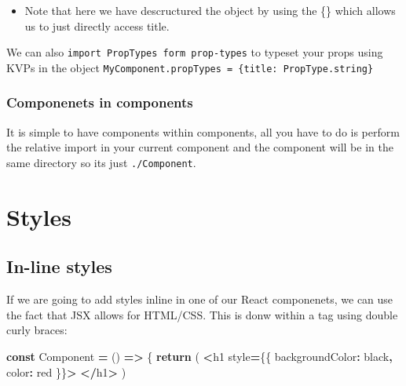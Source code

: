 \documentclass[
]{report}
\newenvironment{Shaded}{\begin{snugshade}}{\end{snugshade}}
\newcommand{\ControlFlowTok}[1]{\textcolor[rgb]{0.13,0.29,0.53}{\textbf{#1}}}
\newcommand{\DataTypeTok}[1]{\textcolor[rgb]{0.13,0.29,0.53}{#1}}
\newcommand{\KeywordTok}[1]{\textcolor[rgb]{0.13,0.29,0.53}{\textbf{#1}}}
\newcommand{\NormalTok}[1]{#1}
\newcommand{\OperatorTok}[1]{\textcolor[rgb]{0.81,0.36,0.00}{\textbf{#1}}}
\newcommand{\StringTok}[1]{\textcolor[rgb]{0.31,0.60,0.02}{#1}}
\providecommand{\tightlist}{%
  \setlength{\itemsep}{0pt}\setlength{\parskip}{0pt}}
\theoremstyle{definition}
\theoremstyle{definition}
\theoremstyle{definition}
\theoremstyle{definition}
\theoremstyle{remark}
\begin{document}
\begin{itemize}
\tightlist
\item
  Note that here we have descructured the object by using the \{\} which allows us to just directly access title.
\end{itemize}

We can also \texttt{import\ PropTypes\ form\ \textquotesingle{}prop-types\textquotesingle{}} to typeset your props using KVPs in the object \texttt{MyComponent.propTypes\ =\ \{title:\ PropType.string\}}

\hypertarget{componenets-in-components}{%
\subsection{Componenets in components}\label{componenets-in-components}}

It is simple to have components within components, all you have to do is
perform the relative import in your current component and the component will be
in the same directory so its just \texttt{\textquotesingle{}./Component}.

\hypertarget{styles}{%
\chapter{Styles}\label{styles}}

\hypertarget{in-line-styles}{%
\section{In-line styles}\label{in-line-styles}}

If we are going to add styles inline in one of our React componenets, we can use the fact that JSX allows for HTML/CSS. This is donw within a tag using double curly braces:

\begin{Shaded}
\begin{Highlighting}[]
\KeywordTok{const}\NormalTok{ Component }\OperatorTok{=}\NormalTok{ () }\KeywordTok{=\textgreater{}}\NormalTok{ \{}
    \ControlFlowTok{return}\NormalTok{ (}
        \OperatorTok{\textless{}}\NormalTok{h1 style}\OperatorTok{=}\NormalTok{\{\{ }\DataTypeTok{backgroundColor}\OperatorTok{:} \StringTok{\textquotesingle{}black\textquotesingle{}}\OperatorTok{,} \DataTypeTok{color}\OperatorTok{:} \StringTok{\textquotesingle{}red\textquotesingle{}}\NormalTok{ \}\}}\OperatorTok{\textgreater{}}
        \OperatorTok{\textless{}/}\NormalTok{h1}\OperatorTok{\textgreater{}}
\NormalTok{    )}
\end{Highlighting}
\end{Shaded}
\end{document}
